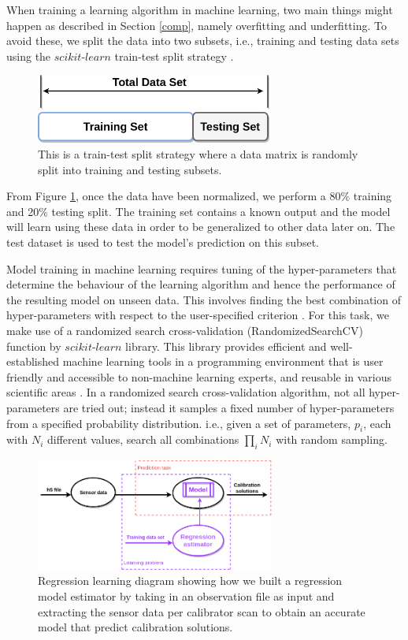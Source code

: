 When training a learning algorithm  in machine learning, two main things might happen as described in Section \ref{comp}, namely overfitting and underfitting. To avoid these, we split the data into two subsets, i.e., training and testing data sets using the $\textit{scikit-learn}$ train-test split strategy \citep{buitinck2013api}. 

  \begin{figure}[H]
  \centering
    \includegraphics[width=0.7\textwidth]{images/t_s.png}
    \caption{This is a train-test split strategy where a data matrix is randomly split into training and testing  subsets.}
  \label{ts}
\end{figure}

From Figure \ref{ts}, once the data have been normalized, we perform a 80$ \%$ training and 20$\%$ testing split. The training set contains a known output and the model will learn using these data in order to be generalized to other data later on. The test dataset is used to test the model's prediction on this subset.
 
Model training in machine learning requires tuning of the  hyper-parameters that determine the behaviour of the learning algorithm and hence the performance
of the resulting model on unseen data. This involves finding the best combination of hyper-parameters with respect to the user-specified criterion \citep{buitinck2013api}. For this task, we make use of a randomized search cross-validation (RandomizedSearchCV) function by $\textit{scikit-learn}$ library. This library provides efficient and well-established machine learning tools in a programming environment that is user friendly and accessible to non-machine learning experts, and reusable in various scientific areas \citep{buitinck2013api}. In a randomized search cross-validation algorithm, not all hyper- parameters are tried out; instead it samples a fixed number of hyper-parameters from a specified probability distribution. i.e., given a set of parameters, $p_i$, each with $N_i$ different values, search all combinations $\prod_i N_i$ with random sampling.
%
%
   \begin{figure}[H]
  \centering
    \includegraphics[width=0.7\textwidth]{images/RegressionEST.png}
    \caption{Regression learning diagram showing how we built a regression model estimator by taking in an observation file as input and extracting the sensor data per calibrator scan to obtain an accurate model that predict calibration solutions.}
  \label{DD}
  \end{figure} 


